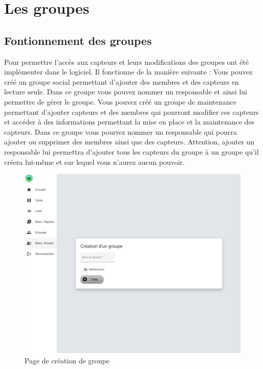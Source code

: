 \section{Les groupes}\label{sec:cree-un-groupe-d-utilisateurs-et-de-capteurs}

    \subsection{Fontionnement des groupes}\label{subsec:fontionnement-des-groupes}

        Pour permettre l'accès aux capteurs et leurs modifications des groupes ont été implémenter dans le logiciel.
        Il fonctionne de la manière suivante :
        Vous pouvez créé un groupe social permettant d'ajouter des membres et des capteurs en lecture seule.
        Dans ce groupe vous pouvez nommer un responsable et ainsi lui permettre de gérer le groupe.
        Vous pouvez créé un groupe de maintenance permettant d'ajouter capteurs et des membres qui pourront modifier ces capteurs
        et accéder à des informations permettant la mise en place et la maintenance des capteurs.
        Dans ce groupe vous pourrez nommer un responsable qui pourra ajouter ou supprimer des membres ainsi que des capteurs.
        Attention, ajouter un responsable lui permettra d'ajouter tous les capteurs du groupe à un groupe qu'il créera lui-même
        et sur lequel vous n'aurez aucun pouvoir.

        \begin{figure}[H]
            \begin{center}
                \includegraphics[width=12cm]{resources/create_group}
            \end{center}
            \caption{Page de création de groupe}\label{fig:create-group}
        \end{figure}

